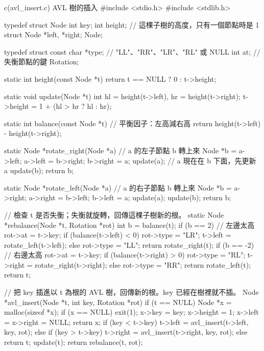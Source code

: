 \begin{example}[label=ex:bal-avl-insert]{c}{(avl\_insert.c) AVL 樹的插入}
#include <stdio.h>
#include <stdlib.h>

typedef struct Node {
    int key;
    int height;                 // 這棵子樹的高度，只有一個節點時是 1
    struct Node *left, *right;
} Node;

typedef struct {
    const char *type;           // "LL"、"RR"、"LR"、"RL" 或 NULL
    int at;                     // 失衡節點的鍵
} Rotation;

static int height(const Node *t)
{
    return t == NULL ? 0 : t->height;
}

static void update(Node *t)
{
    int hl = height(t->left), hr = height(t->right);
    t->height = 1 + (hl > hr ? hl : hr);
}

static int balance(const Node *t)       // 平衡因子：左高減右高
{
    return height(t->left) - height(t->right);
}

static Node *rotate_right(Node *a)      // a 的左子節點 b 轉上來
{
    Node *b = a->left;
    a->left = b->right;
    b->right = a;
    update(a);                          // a 現在在 b 下面，先更新 a
    update(b);
    return b;
}

static Node *rotate_left(Node *a)       // a 的右子節點 b 轉上來
{
    Node *b = a->right;
    a->right = b->left;
    b->left = a;
    update(a);
    update(b);
    return b;
}

// 檢查 t 是否失衡；失衡就旋轉，回傳這棵子樹新的根。
static Node *rebalance(Node *t, Rotation *rot)
{
    int b = balance(t);
    if (b == 2) {                               // 左邊太高
        rot->at = t->key;
        if (balance(t->left) < 0) {
            rot->type = "LR";
            t->left = rotate_left(t->left);
        } else {
            rot->type = "LL";
        }
        return rotate_right(t);
    }
    if (b == -2) {                              // 右邊太高
        rot->at = t->key;
        if (balance(t->right) > 0) {
            rot->type = "RL";
            t->right = rotate_right(t->right);
        } else {
            rot->type = "RR";
        }
        return rotate_left(t);
    }
    return t;
}

// 把 key 插進以 t 為根的 AVL 樹，回傳新的根。key 已經在樹裡就不插。
Node *avl_insert(Node *t, int key, Rotation *rot)
{
    if (t == NULL) {
        Node *x = malloc(sizeof *x);
        if (x == NULL) {
            exit(1);
        }
        x->key = key;
        x->height = 1;
        x->left = x->right = NULL;
        return x;
    }
    if (key < t->key) {
        t->left = avl_insert(t->left, key, rot);
    } else if (key > t->key) {
        t->right = avl_insert(t->right, key, rot);
    } else {
        return t;
    }
    update(t);
    return rebalance(t, rot);
}


\end{example}

